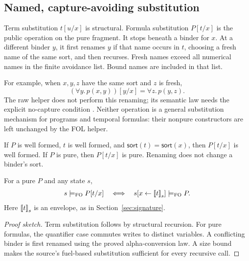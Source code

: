 \subsection{Named, capture-avoiding substitution}
Term substitution $t[u/x]$ is structural. Formula substitution $P[t/x]$ is
the public  operation on the pure fragment. It stops beneath
a binder for $x$. At a different binder $y$, it first renames $y$ if that
name occurs in $t$, choosing a fresh name of the same sort, and then recurses.
Fresh names exceed all numerical names in the finite avoidance list. Bound
names are included in that list.

For example, when $x,y,z$ have the same sort and $z$ is fresh,
\[
 (\forall y.\,p(x,y))[y/x]=\forall z.\,p(y,z).
\]
The raw helper  does not perform this renaming; its semantic
law needs the explicit no-capture condition . Neither
operation is a general substitution mechanism for programs and temporal
formulas: their nonpure constructors are left unchanged by the FOL helper.

\begin{proposition}[Preservation]
If $P$ is well formed, $t$ is well formed, and
$\mathsf{sort}(t)=\mathsf{sort}(x)$, then $P[t/x]$ is well formed. If $P$ is
pure, then $P[t/x]$ is pure. Renaming does not change a binder's sort.
\end{proposition}

\begin{lemma}
For a pure $P$ and any state $s$,
\[
 s\models_{\mathrm{FO}} P[t/x]
 \quad\Longleftrightarrow\quad
 s[x\leftarrow\mathopen{[\![}t\mathclose{]\!]}_{s}]\models_{\mathrm{FO}}P.
\]
Here $\mathopen{[\![}t\mathclose{]\!]}_{s}$ is an envelope, as in Section~\ref{sec:signature}.
\end{lemma}

\begin{proof}[Proof sketch]
Term substitution follows by structural recursion. For pure formulas, the
quantifier case commutes writes to distinct variables. A conflicting binder
is first renamed using the proved alpha-conversion law. A size bound makes
the source's fuel-based substitution sufficient for every recursive call.
\end{proof}
